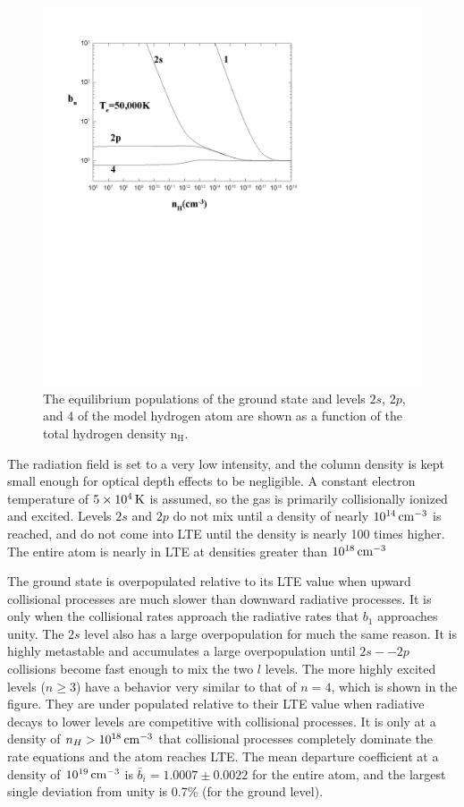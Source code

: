 \begin{figure}
\label{fig:HDepartCoefVsDensity}
\centering
\includegraphics[scale=0.8]{HDepartCoefVsDensity}
\caption[H populations vs density]{The equilibrium populations of the ground state and levels  $2s$,
$2p$, and 4 of the model hydrogen atom
are shown as a function of the total
hydrogen density n$_{\mathrm{H}}$.}%
\end{figure}

The radiation field is set to a very low intensity, and the column density
is kept small enough for optical depth effects to be negligible.  A constant
electron temperature of $5\times  10^4 {\rm\thinspace K}$ is assumed, so the gas is primarily
collisionally ionized and excited.
Levels $2s$ and $2p$ do not mix until a
density of nearly $10^{14} {\rm\thinspace cm^{-3}}$ is reached,
and do not come into LTE until the
density is nearly 100 times higher.
The entire atom is nearly in LTE at
densities greater than $10^{18} {\rm\thinspace cm^{-3}}$

The ground state is overpopulated relative to its LTE value when upward
collisional processes are much slower than downward radiative processes.
It is only when the collisional rates approach the radiative rates that
$b_1$ approaches unity.
The $2s$ level also has a large overpopulation for much
the same reason.  It is highly metastable and accumulates a large
overpopulation until $2s -- 2p$ collisions become fast enough
to mix the two $l$ levels.
The more highly excited levels ($n\ge  3$) have a behavior very similar
to that of $n=4$, which is shown in the figure.  They are under populated
relative to their LTE value when radiative decays to lower levels are
competitive with collisional processes.
It is only at a density of $n_H > 10^{18} {\rm\thinspace cm^{-3}}$ that collisional processes completely dominate the rate equations
and the atom reaches LTE.
The mean departure coefficient at a density of
$10^{19} {\rm\thinspace cm^{-3}}$ is ${\bar b_i} = 1.0007 \pm 0.0022$
for the entire atom, and the largest single deviation from unity is
0.7\% (for the ground level).

